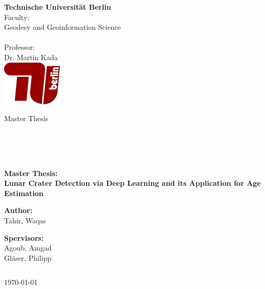 \documentclass[11pt]{article}
\begin{document}
\begin{titlepage}
	\begin{multicols}{2} 
		\textbf {Technische Universit\"{a}t Berlin}\\
		Faculty:            \\ Geodesy and Geoinformation Science\\  \\
		Professor: \\
		Dr. Martin Kada\\
		\columnbreak
		\flushright
		\includegraphics{files/TU} 
	\end{multicols}

	\vspace{0.1\textheight}
	
	\begin{center}
		Master Thesis
	\end{center}
	
	\begin{verbatim}
 
 
 
	\end{verbatim}
	\begin{center}
		\textbf{\Large{Master Thesis: \\[1 cm] Lunar Crater Detection via Deep Learning and its Application for Age Estimation}}
	\end{center}
	\vspace{0.25\textheight}
	\begin{center}
		\vspace{0.7cm}
		\textbf{Author:}\\
		Tahir, Waqas \\
	\end{center}
	\begin{center}	
		\textbf{Spervisors:}\\
		Agoub, Amgad\\
		Gläser, Philipp
	\end{center}
	\begin{verbatim}
	\end{verbatim}
	\begin{center}
		\today
	\end{center}

\end{titlepage}
\end{document}
